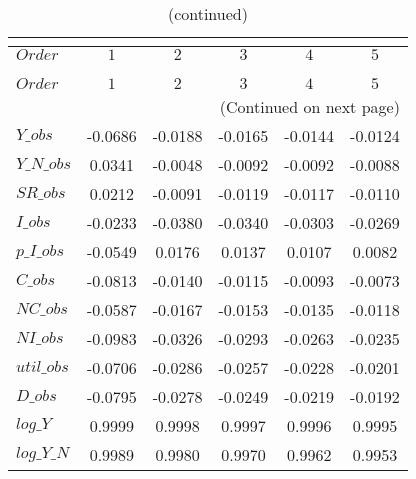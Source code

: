  
\begin{center}
\begin{longtable}{lccccc} 
\caption{COEFFICIENTS OF AUTOCORRELATION}\\
 \label{Table:th_autocorr_matrix}\\
\toprule 
$Order      $	 & 	 $          1$	 & 	 $          2$	 & 	 $          3$	 & 	 $          4$	 & 	 $          5$\\
\midrule \endfirsthead 
\caption{(continued)}\\
 \toprule \\ 
$Order      $	 & 	 $          1$	 & 	 $          2$	 & 	 $          3$	 & 	 $          4$	 & 	 $          5$\\
\midrule \endhead 
\midrule \multicolumn{6}{r}{(Continued on next page)} \\ \bottomrule \endfoot 
\bottomrule \endlastfoot 
$Y\_obs     $	 & 	    -0.0686	 & 	    -0.0188	 & 	    -0.0165	 & 	    -0.0144	 & 	    -0.0124 \\ 
$Y\_N\_obs  $	 & 	     0.0341	 & 	    -0.0048	 & 	    -0.0092	 & 	    -0.0092	 & 	    -0.0088 \\ 
$SR\_obs    $	 & 	     0.0212	 & 	    -0.0091	 & 	    -0.0119	 & 	    -0.0117	 & 	    -0.0110 \\ 
$I\_obs     $	 & 	    -0.0233	 & 	    -0.0380	 & 	    -0.0340	 & 	    -0.0303	 & 	    -0.0269 \\ 
$p\_I\_obs  $	 & 	    -0.0549	 & 	     0.0176	 & 	     0.0137	 & 	     0.0107	 & 	     0.0082 \\ 
$C\_obs     $	 & 	    -0.0813	 & 	    -0.0140	 & 	    -0.0115	 & 	    -0.0093	 & 	    -0.0073 \\ 
$NC\_obs    $	 & 	    -0.0587	 & 	    -0.0167	 & 	    -0.0153	 & 	    -0.0135	 & 	    -0.0118 \\ 
$NI\_obs    $	 & 	    -0.0983	 & 	    -0.0326	 & 	    -0.0293	 & 	    -0.0263	 & 	    -0.0235 \\ 
$util\_obs  $	 & 	    -0.0706	 & 	    -0.0286	 & 	    -0.0257	 & 	    -0.0228	 & 	    -0.0201 \\ 
$D\_obs     $	 & 	    -0.0795	 & 	    -0.0278	 & 	    -0.0249	 & 	    -0.0219	 & 	    -0.0192 \\ 
$log\_Y     $	 & 	     0.9999	 & 	     0.9998	 & 	     0.9997	 & 	     0.9996	 & 	     0.9995 \\ 
$log\_Y\_N  $	 & 	     0.9989	 & 	     0.9980	 & 	     0.9970	 & 	     0.9962	 & 	     0.9953 \\ 

\end{longtable}
\end{center}
